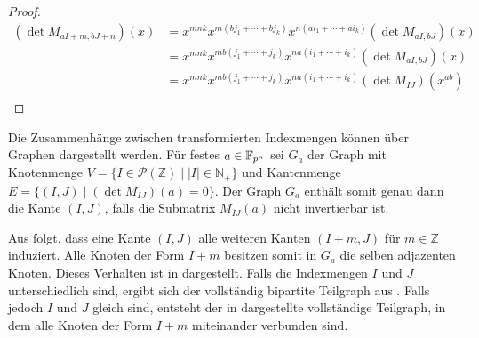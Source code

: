 \begin{proof}
    \begin{align*}
        \left( \det{} M_{aI+m,bJ+n} \right) (x)     &= x^{mnk} x^{m(bj_1 +\cdots + bj_k)} x^{n(ai_1+\cdots +ai_k)} \left( \det{} M_{aI,bJ} \right) (x) \\
                                                    &= x^{mnk} x^{mb(j_1 +\cdots + j_k)} x^{na(i_1+\cdots +i_k)} \left( \det{} M_{aI,bJ} \right) (x) \\
                                                    &= x^{mnk} x^{mb(j_1 +\cdots + j_k)} x^{na(i_1+\cdots +i_k)} \left( \det{} M_{IJ} \right) (x^{ab}) \\
    \end{align*}
\end{proof}

Die Zusammenhänge zwischen transformierten Indexmengen können über Graphen dargestellt werden. Für festes $a \in \field{p}[n]$ sei $G_a$ der Graph mit Knotenmenge $V=\{I \in\mathcal{P}(\mathbb{Z}) \mid |I| \in \mathbb{N}_+\}$ und Kantenmenge $E = \{(I,J)\mid (\det M_{IJ})(a) = 0\}$. Der Graph $G_a$ enthält somit genau dann die Kante $(I,J)$, falls die Submatrix $M_{IJ}(a)$ nicht invertierbar ist. 

Aus  folgt, dass eine Kante $(I,J)$ alle weiteren Kanten $(I+m,J)$ für $m\in \mathbb{Z}$ induziert. Alle Knoten der Form $I+m$ besitzen somit in $G_a$ die selben adjazenten Knoten. Dieses Verhalten ist in  dargestellt. Falls die Indexmengen $I$ und $J$ unterschiedlich sind, ergibt sich der vollständig bipartite Teilgraph aus . Falls jedoch $I$ und $J$ gleich sind, entsteht der in  dargestellte vollständige Teilgraph, in dem alle Knoten der Form $I+m$ miteinander verbunden sind. 

